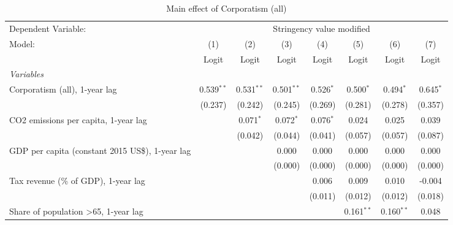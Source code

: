 
\begin{table}[htbp]
   \caption{Main effect of Corporatism (all)}
   \centering
   \begin{tabular}{lccccccc}
      \toprule
      Dependent Variable: & \multicolumn{7}{c}{Stringency value modified}\\
      Model:                                                & (1)          & (2)          & (3)          & (4)         & (5)          & (6)          & (7)\\  
                                                            &  Logit       & Logit        & Logit        & Logit       & Logit        & Logit        & Logit\\  
      \midrule
      \emph{Variables}\\
      Corporatism (all), 1-year lag                         & 0.539$^{**}$ & 0.531$^{**}$ & 0.501$^{**}$ & 0.526$^{*}$ & 0.500$^{*}$  & 0.494$^{*}$  & 0.645$^{*}$\\   
                                                            & (0.237)      & (0.242)      & (0.245)      & (0.269)     & (0.281)      & (0.278)      & (0.357)\\   
      CO2 emissions per capita, 1-year lag                  &              & 0.071$^{*}$  & 0.072$^{*}$  & 0.076$^{*}$ & 0.024        & 0.025        & 0.039\\   
                                                            &              & (0.042)      & (0.044)      & (0.041)     & (0.057)      & (0.057)      & (0.087)\\   
      GDP per capita (constant 2015 US\$), 1-year lag       &              &              & 0.000        & 0.000       & 0.000        & 0.000        & 0.000\\   
                                                            &              &              & (0.000)      & (0.000)     & (0.000)      & (0.000)      & (0.000)\\   
      Tax revenue (\% of GDP), 1-year lag                   &              &              &              & 0.006       & 0.009        & 0.010        & -0.004\\   
                                                            &              &              &              & (0.011)     & (0.012)      & (0.012)      & (0.018)\\   
      Share of population >65, 1-year lag                   &              &              &              &             & 0.161$^{**}$ & 0.160$^{**}$ & 0.048\\   

\end{tabular}
\end{table}
